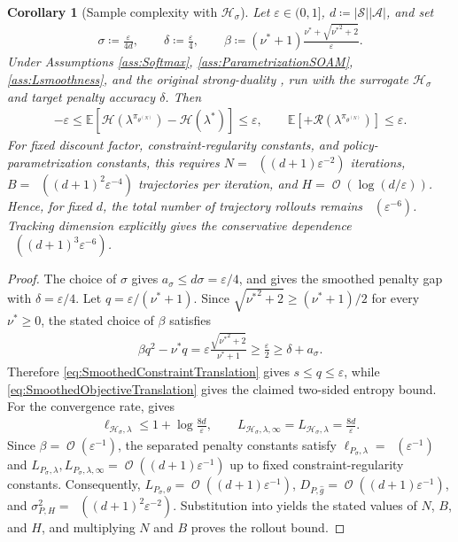 \documentclass{article}
\theoremstyle{plain}
\newtheorem{corollary}[theorem]{Corollary}
\theoremstyle{definition}
\theoremstyle{remark}
\def\SS{{\mathcal{S}}}
\def\AA{{\mathcal{A}}}
\DeclareMathOperator{\OOTildeSym}{\widetilde{\mathcal{O}}}
\DeclareMathOperator{\OOSym}{\mathcal{O}}
\newcommand{\OOTilde}[1]{{\OOTildeSym\!\left(#1\right)}}
\newcommand{\OO}[1]{{\OOSym\!\left(#1\right)}}
\newcommand{\card}[1]{\left|#1\right|}
\def\epsilon{{\varepsilon}}
\newcommand{\Exp}[1]{{ \mathbb{E}}\!\left[#1\right]}
\DeclarePairedDelimiter{\plus}{[}{]_{+}}
\newcommand{\define}{\coloneqq}
\def\xx{{\theta}}
\def\xxN{\xx^{(N)}}
\def\nuOpt{{\nu^{*}}}
\def\HH{{\mathcal{H}}}
\def\gApprox{{\hat{g}}}
\def\Reg{{\mathcal{R}}}
\begin{document}
\begin{corollary}[{Sample complexity with $\HH_\sigma$}]
 \label{cor:SmoothedEntropyFinalRate}
 {Let $\epsilon\in(0,1]$, $d\define\card{\SS}\card{\AA}$, and set}
 \begin{align*}
  {\sigma\define\frac{\epsilon}{4d},\qquad
   \delta\define\frac{\epsilon}{4},\qquad
   \beta\define(\nuOpt+1)
   \frac{\nuOpt+\sqrt{\nuOpt^2+2}}{\epsilon}.}
 \end{align*}
 {Under Assumptions \ref{ass:Softmax},
 \ref{ass:ParametrizationSOAM}, \ref{ass:Lsmoothness}, and the original
 strong-duality , run  with the
 surrogate $\HH_\sigma$ and target penalty accuracy $\delta$. Then}
 \begin{align*}
  {-\epsilon\leq
   \Exp{\HH(\lambda^{\pi_{\xxN}})-\HH(\lambda^*)}\leq\epsilon,
   \qquad
   \Exp{\plus{\Reg(\lambda^{\pi_{\xxN}})}}\leq\epsilon.}
 \end{align*}
 {For fixed discount factor, constraint-regularity constants, and
 policy-parametrization constants, this requires
 $N=\OOTilde{(d+1)\epsilon^{-2}}$ iterations,
 $B=\OOTilde{(d+1)^2\epsilon^{-4}}$ trajectories per iteration, and
 $H=\OO{\log(d/\epsilon)}$. Hence, for fixed $d$, the total number of
 trajectory rollouts remains $\OOTilde{\epsilon^{-6}}$. Tracking dimension
 explicitly gives the conservative dependence $\OOTilde{(d+1)^3\epsilon^{-6}}$.}
\end{corollary}
\begin{proof}
 {The choice of $\sigma$ gives $a_\sigma\leq d\sigma=\epsilon/4$,
  and  gives the smoothed penalty gap with
  $\delta=\epsilon/4$. Let $q=\epsilon/(\nuOpt+1)$. Since
  $\sqrt{\nuOpt^2+2}\geq(\nuOpt+1)/2$ for every $\nuOpt\geq0$, the
  stated choice of $\beta$ satisfies}
 \begin{align*}
  \beta q^2-\nuOpt q
  =\epsilon\frac{\sqrt{\nuOpt^2+2}}{\nuOpt+1}
  \geq\frac{\epsilon}{2}\geq\delta+a_\sigma.
 \end{align*}
 {Therefore \eqref{eq:SmoothedConstraintTranslation} gives
 $s\leq q\leq\epsilon$, while
 \eqref{eq:SmoothedObjectiveTranslation} gives the claimed two-sided
 entropy bound.}
 {For the convergence rate,  gives}
 \begin{align*}
  {\ell_{\HH_\sigma,\lambda}}
  {\leq1+\log\frac{8d}{\epsilon},}
  \qquad {L_{\HH_\sigma,\lambda,\infty}
  =L_{\HH_\sigma,\lambda}}
  {=\frac{8d}{\epsilon}.}
 \end{align*}
 {Since $\beta=\OO{\epsilon^{-1}}$, the separated penalty constants
 satisfy
 $\ell_{P_\sigma,\lambda}=\OOTilde{\epsilon^{-1}}$ and
 $L_{P_\sigma,\lambda},L_{P_\sigma,\lambda,\infty}
  =\OO{(d+1)\epsilon^{-1}}$ up to fixed constraint-regularity constants.
 Consequently, $L_{P_\sigma,\theta}=\OO{(d+1)\epsilon^{-1}}$,
 $D_{P,\gApprox}=\OO{(d+1)\epsilon^{-1}}$, and
 $\sigma_{P,H}^2=\OOTilde{(d+1)^2\epsilon^{-2}}$.
 Substitution into  yields the stated values of
 $N$, $B$, and $H$, and multiplying $N$ and $B$ proves the rollout bound.}
\end{proof}
\end{document}
